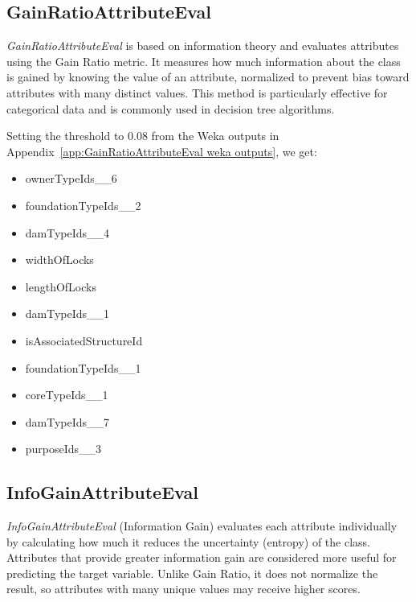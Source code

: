 \documentclass{article}
\begin{document}
\subsection{GainRatioAttributeEval}
\textit{GainRatioAttributeEval} is based on information theory and evaluates attributes using the Gain Ratio metric. 
It measures how much information about the class is gained by knowing the value of an attribute, normalized to prevent bias toward attributes with many distinct values. 
This method is particularly effective for categorical data and is commonly used in decision tree algorithms.

Setting the threshold to 0.08 from the Weka outputs in Appendix~\ref{app:GainRatioAttributeEval weka outputs}, we get:
\begin{multicols}{2}
    \begin{itemize}
        \item ownerTypeIds\_\_6
        \item foundationTypeIds\_\_2
        \item damTypeIds\_\_4
        \item widthOfLocks
        \item lengthOfLocks
        \item damTypeIds\_\_1
        \item isAssociatedStructureId
        \item foundationTypeIds\_\_1
        \item coreTypeIds\_\_1
        \item damTypeIds\_\_7
        \item purposeIds\_\_3
    \end{itemize}
\end{multicols}

\subsection{InfoGainAttributeEval}
\textit{InfoGainAttributeEval} (Information Gain) evaluates each attribute individually by calculating how much it reduces the uncertainty (entropy) of the class. 
Attributes that provide greater information gain are considered more useful for predicting the target variable. 
Unlike Gain Ratio, it does not normalize the result, so attributes with many unique values may receive higher scores.
\end{document}
